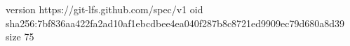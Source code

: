version https://git-lfs.github.com/spec/v1
oid sha256:7bf836aa422fa2ad10af1ebcdbee4ea040f287b8c8721ed9909ec79d680a8d39
size 75
